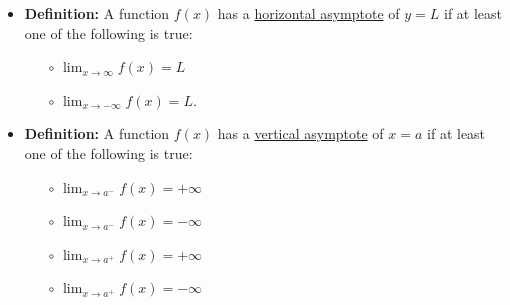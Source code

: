 \documentclass[12pt]{article}
\begin{document}
\begin{itemize}

\item {\bf Definition:} A function $f(x)$ has a \underline{horizontal asymptote} of $y=L$ if at least one of the following is true:

\begin{itemize}

\item[$\circ$] $\displaystyle \lim_{x \rightarrow \infty}{f(x)}=L$

\item[$\circ$] $\displaystyle \lim_{x \rightarrow -\infty}{f(x)}=L$.

\end{itemize}

\item {\bf Definition:} A function $f(x)$ has a \underline{vertical asymptote} of $x=a$ if at least one of the following is true:

\begin{itemize}

\item[$\circ$] $\displaystyle \lim_{x \rightarrow a^-}{f(x)}=+\infty$

\item[$\circ$] $\displaystyle \lim_{x \rightarrow a^-}{f(x)}=-\infty$

\item[$\circ$] $\displaystyle \lim_{x \rightarrow a^+}{f(x)}=+\infty$

\item[$\circ$] $\displaystyle \lim_{x \rightarrow a^+}{f(x)}=-\infty$

\end{itemize}

\end{itemize}
\end{document}
